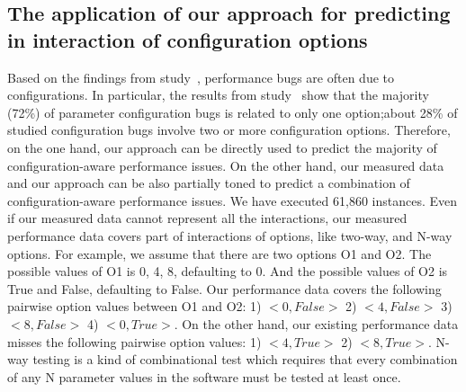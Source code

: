 \subsection{The application of our approach for predicting \inconsistent in interaction of configuration options}
Based on the findings from study~\cite{RN2864}, performance bugs are often due to configurations. In particular, the results from study~\cite{RN2864} show that the majority (72\%) of parameter configuration bugs is related to only one option;about 28\% of studied configuration bugs involve two or more configuration options. 
Therefore, on the one hand, our approach can be directly used to predict the majority of configuration-aware performance issues. On the other hand, our measured data and our approach can be also partially toned to predict a combination of configuration-aware performance issues. We have executed 61,860 \instance instances. Even if our measured data cannot represent all the interactions, our measured performance data covers part of interactions of options, like two-way, and N-way options. For example, we assume that there are two options O1 and O2. The possible values of O1 is 0, 4, 8, defaulting to 0. And the possible values of O2 is True and False, defaulting to False. Our performance data covers the following pairwise option values between O1 and O2: 1) $<0, False>$ 2) $<4, False>$ 3) $<8, False>$ 4) $<0, True>$. On the other hand, our existing performance data misses the following pairwise option values: 1) $<4, True>$ 2) $<8, True>$. N-way testing is a kind of combinational test which requires that every combination of any N parameter values in the software must be tested at least once.


